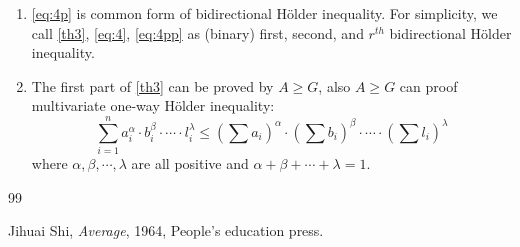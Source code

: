 \documentclass[12pt,a4paper,reqno]{amsart}
\theoremstyle{plain}
\theoremstyle{definition}
\begin{document}
\begin{enumerate}
Specifically, when $p=q=1$, \eqref{eq:4} becomes 

\begin{equation}\label{eq:4p}
  | \mathbb{a}\cdot\mathbb{b}|\begin{array}{c}
  \leqslant \\ 
  \geqslant    
  \end{array}
  |\mathbb{a}|_k \cdot | \mathbb{b}|_{k'}, \textnormal{when}~k
  \begin{array}{l}
    >  \\  
    <      
  \end{array}
  1.  \tag{$4'$} 
\end{equation}
Also, when $p=1$, $q=r-1$, take $k=r$, get $(k'=\frac{r}{r-1})$ 

\begin{equation}\label{eq:4pp}
  | \mathbb{a}\cdot\mathbb{b}^{r-1}|\begin{array}{c}
  \leqslant \\ 
  \geqslant    
  \end{array}
  |\mathbb{a}|_r \cdot | \mathbb{b}|_r^{r-1}, \textnormal{when}~r
  \begin{array}{l}
    >  \\  
    <      
  \end{array}
  1.  \tag{$4''$} 
\end{equation}

\item [$3^{\circ}$] \eqref{eq:4p} is common form of bidirectional H\"older inequality. For simplicity, we call \eqref{th3}, \eqref{eq:4}, \eqref{eq:4pp} as (binary) first, second, and $r^{th}$ bidirectional H\"older inequality.  

\item [$4^{\circ}$] The first part of \eqref{th3} can be proved by $A\geqslant G$, also $A\geqslant G$ can proof multivariate one-way H\"older inequality:
\begin{equation}\label{eq:4}
  \sum_{i=1}^n a_i^{\alpha}\cdot b_i^{\beta}\cdot \cdots \cdot l_i^{\lambda} \leqslant\left(\sum a_i\right)^{\alpha} \cdot \left(\sum b_i\right)^{\beta}\cdot \cdots \cdot \left(\sum l_i\right)^{\lambda}
\end{equation}
where $\alpha, \beta, \cdots, \lambda$ are all positive and $\alpha + \beta + \cdots + \lambda = 1$. 

\end{enumerate}




\begin{thebibliography}{99} 

 Jihuai Shi, \textit{Average}, 1964, People's education press.  


\end{thebibliography}
\end{document}
